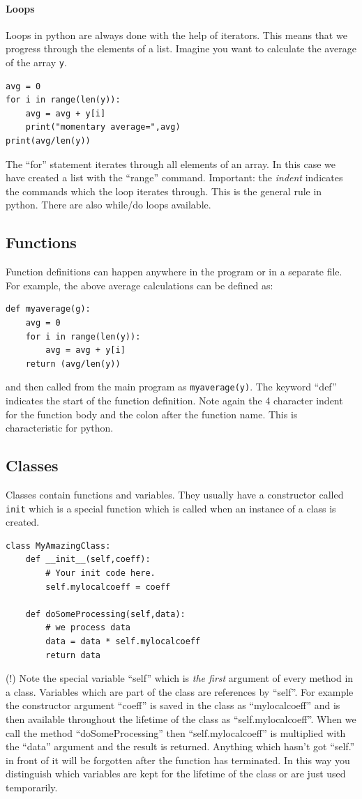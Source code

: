 \documentclass[12pt,a4paper]{article}
\begin{document}
\paragraph{Loops}
Loops in python are always done with the help of iterators. This
means that we progress through the elements of a list.
Imagine you want to calculate the average of the array \texttt{y}.
\begin{verbatim}
avg = 0
for i in range(len(y)):
    avg = avg + y[i]
    print("momentary average=",avg)
print(avg/len(y))
\end{verbatim}
The ``for'' statement iterates through all elements of an array. In this
case we have created a list with the ``range'' command. Important: the \textsl{indent}
indicates the commands which the loop iterates through. This is the general rule in python.
There are also while/do loops available.


\subsection{Functions}
Function definitions can happen anywhere in the program or in a separate file.
For example, the above average calculations can be defined as:

\begin{verbatim}
def myaverage(g):
    avg = 0
    for i in range(len(y)):
        avg = avg + y[i]
    return (avg/len(y))
\end{verbatim}
and then called from the main program as \texttt{myaverage(y)}.
The keyword ``def'' indicates the start of the function definition.
Note again the 4 character indent
for the function body and the colon after the function name. This is characteristic
for python.


\subsection{Classes}
Classes contain functions and variables. They usually
have a constructor called \texttt{init} which is a special function which is called
when an instance of a class is created.
\begin{verbatim}
class MyAmazingClass:
    def __init__(self,coeff):
        # Your init code here.
        self.mylocalcoeff = coeff

    def doSomeProcessing(self,data):
        # we process data
        data = data * self.mylocalcoeff
        return data
\end{verbatim}
(!) Note the special variable ``self'' which is \textsl{the first}
argument of every method in a class. Variables which
are part of the class are references by ``self''. For
example the constructor argument ``coeff'' is saved
in the class as ``mylocalcoeff'' and is then available
throughout the lifetime of the class as ``self.mylocalcoeff''. When we call
the method ``doSomeProcessing'' then ``self.mylocalcoeff''
is multiplied with the ``data'' argument and the result
is returned. Anything which hasn't got ``self.'' in front
of it will be forgotten after the function has terminated.
In this way you distinguish which variables are kept
for the lifetime of the class or
are just used temporarily.
\end{document}
